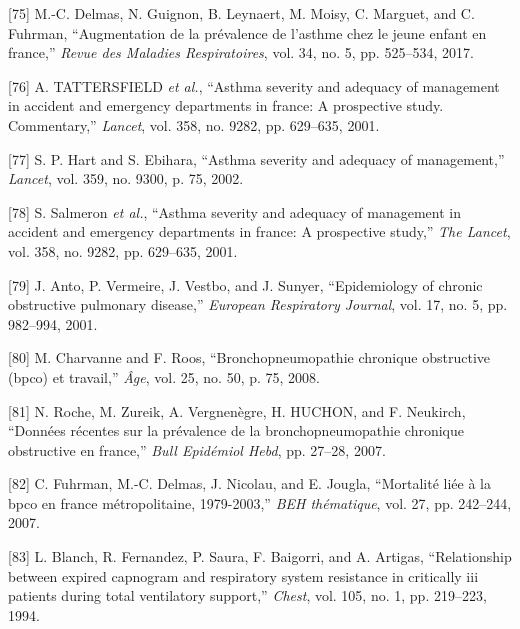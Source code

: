 \documentclass[12pt,]{article}
\begin{document}
\leavevmode\hypertarget{ref-delmas2017augmentation}{}%
{[}75{]} M.-C. Delmas, N. Guignon, B. Leynaert, M. Moisy, C. Marguet,
and C. Fuhrman, ``Augmentation de la prévalence de l'asthme chez le
jeune enfant en france,'' \emph{Revue des Maladies Respiratoires}, vol.
34, no. 5, pp. 525--534, 2017.

\leavevmode\hypertarget{ref-tattersfield2001asthma}{}%
{[}76{]} A. TATTERSFIELD \emph{et al.}, ``Asthma severity and adequacy
of management in accident and emergency departments in france: A
prospective study. Commentary,'' \emph{Lancet}, vol. 358, no. 9282, pp.
629--635, 2001.

\leavevmode\hypertarget{ref-hart2002asthma}{}%
{[}77{]} S. P. Hart and S. Ebihara, ``Asthma severity and adequacy of
management,'' \emph{Lancet}, vol. 359, no. 9300, p. 75, 2002.

\leavevmode\hypertarget{ref-salmeron2001asthma}{}%
{[}78{]} S. Salmeron \emph{et al.}, ``Asthma severity and adequacy of
management in accident and emergency departments in france: A
prospective study,'' \emph{The Lancet}, vol. 358, no. 9282, pp.
629--635, 2001.

\leavevmode\hypertarget{ref-anto2001epidemiology}{}%
{[}79{]} J. Anto, P. Vermeire, J. Vestbo, and J. Sunyer, ``Epidemiology
of chronic obstructive pulmonary disease,'' \emph{European Respiratory
Journal}, vol. 17, no. 5, pp. 982--994, 2001.

\leavevmode\hypertarget{ref-charvanne2008bronchopneumopathie}{}%
{[}80{]} M. Charvanne and F. Roos, ``Bronchopneumopathie chronique
obstructive (bpco) et travail,'' \emph{Âge}, vol. 25, no. 50, p. 75,
2008.

\leavevmode\hypertarget{ref-roche2007donnees}{}%
{[}81{]} N. Roche, M. Zureik, A. Vergnenègre, H. HUCHON, and F.
Neukirch, ``Données récentes sur la prévalence de la bronchopneumopathie
chronique obstructive en france,'' \emph{Bull Epidémiol Hebd}, pp.
27--28, 2007.

\leavevmode\hypertarget{ref-fuhrman2007mortalite}{}%
{[}82{]} C. Fuhrman, M.-C. Delmas, J. Nicolau, and E. Jougla,
``Mortalité liée à la bpco en france métropolitaine, 1979-2003,''
\emph{BEH thématique}, vol. 27, pp. 242--244, 2007.

\leavevmode\hypertarget{ref-blanch1994relationship}{}%
{[}83{]} L. Blanch, R. Fernandez, P. Saura, F. Baigorri, and A. Artigas,
``Relationship between expired capnogram and respiratory system
resistance in critically iii patients during total ventilatory
support,'' \emph{Chest}, vol. 105, no. 1, pp. 219--223, 1994.
\end{document}
